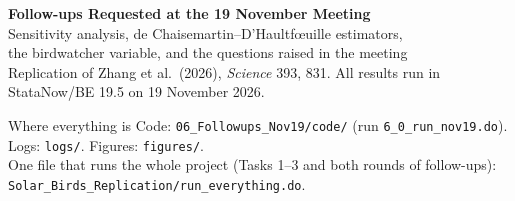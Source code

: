 \documentclass[11pt]{article}
\begin{document}
\begin{center}
{\LARGE\bfseries Follow-ups Requested at the 19 November Meeting}\\[6pt]
{\large Sensitivity analysis, de Chaisemartin--D'Haultf\oe uille estimators,\\ the birdwatcher variable, and the questions raised in the meeting}\\[6pt]
{\small Replication of Zhang et al.\ (2026), \textit{Science} 393, 831. All results run in StataNow/BE 19.5 on 19 November 2026.}
\end{center}

\begin{keybox}{Where everything is}
Code: \texttt{06\_Followups\_Nov19/code/} (run \texttt{6\_0\_run\_nov19.do}). Logs: \texttt{logs/}. Figures: \texttt{figures/}.\\
One file that runs the whole project (Tasks 1--3 and both rounds of follow-ups): \texttt{Solar\_Birds\_Replication/run\_everything.do}.
\end{keybox}
\end{document}

